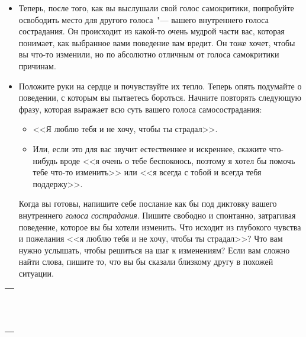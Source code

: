 \begin{itemize}
	\item Теперь, после того, как вы выслушали свой голос самокритики, попробуйте освободить место для другого голоса~"--- вашего внутреннего голоса сострадания. Он происходит из какой-то очень мудрой части вас, которая понимает, как выбранное вами поведение вам вредит. Он тоже хочет, чтобы вы что-то изменили, но по абсолютно отличным от голоса самокритики причинам.
	
	\item Положите руки на сердце и почувствуйте их тепло. Теперь опять подумайте о поведении, с которым вы пытаетесь бороться. Начните повторять следующую фразу, которая выражает всю суть вашего голоса самосострадания:
	\begin{itemize}
		\item <<Я люблю тебя и не хочу, чтобы ты страдал>>. 
		
		\item Или, если это для вас звучит естественнее и искреннее, скажите что-нибудь вроде <<я очень о тебе беспокоюсь, поэтому я хотел бы помочь тебе что-то изменить>> или <<я всегда с тобой и всегда тебя поддержу>>.	
	\end{itemize}

	\itemWritingHand Когда вы готовы, напишите себе послание как бы под диктовку вашего внутреннего \emph{голоса сострадания}. Пишите свободно и спонтанно, затрагивая поведение, которое вы бы хотели изменить. Что исходит из глубокого чувства и пожелания <<я люблю тебя и не хочу, чтобы ты страдал>>? Что вам нужно услышать, чтобы решиться на шаг к изменениям? Если вам сложно найти слова, пишите то, что вы бы сказали близкому другу в похожей ситуации.
\end{itemize}
\setlength{\extrarowheight}{2mm}
\begin{tabularx}{\textwidth}{X}
	\\
	\arrayrulecolor{gray}\hline\\
	\hline\\
	\hline\\
	\hline\\
	\hline\\
	\hline\\	
	\hline\\
	\hline\\
	\hline\\
	\hline\\
	\hline\\
	\hline\\
	\hline\\
\end{tabularx}
\setlength{\extrarowheight}{0mm}

